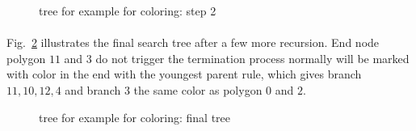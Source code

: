     \begin{figure}[!ht]
        \centering
        \caption[Tree for example for coloring: step 2]{tree for example for coloring: step 2}
        \label{qdt_fig:qdt_color_tree_1}
    \end{figure}

\paragraph{}
Fig.~\ref{qdt_fig:qdt_color_tree_2} illustrates the final search tree after a few more recursion.
End node polygon $11$ and $3$ do not trigger the termination process normally will be marked with color in the end with the youngest parent rule, which gives branch $11,10,12,4$ and branch $3$ the same color as polygon $0$ and $2$.

    \begin{figure}[!ht]
        \centering
        \caption[Tree for example for coloring: final tree]{tree for example for coloring: final tree}
        \label{qdt_fig:qdt_color_tree_2}
    \end{figure}

\pagebreak